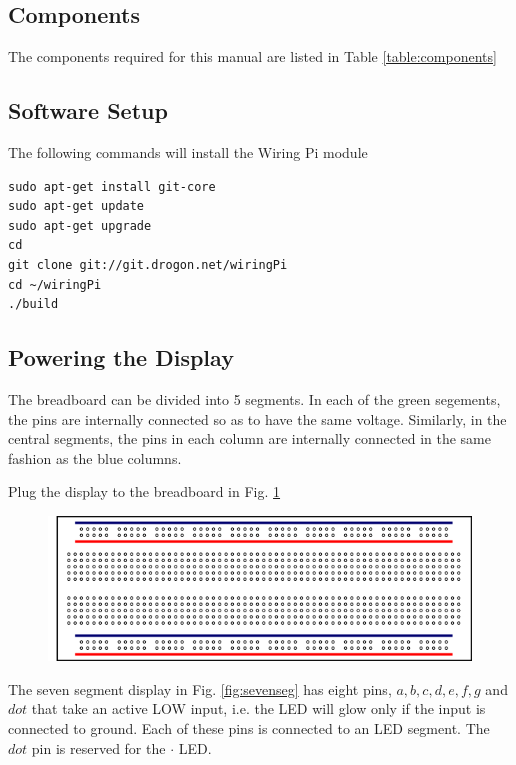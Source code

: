 \subsection{Components}
The components required for this manual are listed in Table \ref{table:components}

\subsection{Software Setup}
The following commands will install the Wiring Pi module \cite{wiringpi}
\begin{lstlisting}
sudo apt-get install git-core
sudo apt-get update
sudo apt-get upgrade
cd
git clone git://git.drogon.net/wiringPi
cd ~/wiringPi
./build
\end{lstlisting}
\subsection{Powering the Display}
The breadboard can be divided into 5 segments.  In each of the green segements, the pins are internally connected so as to have the same voltage.  Similarly, in the central segments, the pins in each column  are internally connected in the same fashion as the blue columns. 

\begin{problem}
	Plug the display to the breadboard in Fig. \ref{fig:breadboard}
\end{problem}
\begin{figure}[!h]
\begin{center}
\includegraphics[width=\columnwidth]{./figs/breadboard}
\end{center}
\caption{}
\label{fig:breadboard}
\end{figure}

The seven segment display in Fig. \ref{fig:sevenseg} has eight pins, $a, b, c, d, e, f, g$ and $dot$ that take an active LOW input, i.e.  the LED will glow only if the input is connected to ground.  Each of these pins is connected to an LED segment.  The $dot$ pin is  reserved for the $\cdot$ LED.  

